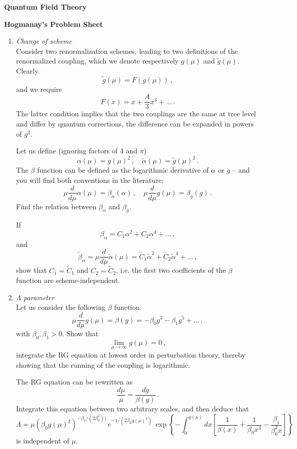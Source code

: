 \documentclass[12pt,a4paper]{article}
\begin{document}
\begin{center}
{\bf Quantum Field Theory}\\[\baselineskip]
\end{center}
{\bf Hogmanay's Problem Sheet}

\begin{enumerate}
\item {\it Change of scheme} \\

  Consider two renormalization schemes, leading to two definitions of
  the renormalized coupling, which we denote respectively $g(\mu)$ and
  $\tilde{g}(\mu)$. Clearly
  \[
    \tilde{g}(\mu) = F\left(g(\mu)\right)\, ,
  \]
  and we require
  \[
    F(x) = x + \frac{A}{3} x^3 + \ldots\, .
  \]
  The latter condition implies that the two couplings are the same at
  tree level and differ by quantum corrections, \ie the difference can
  be expanded in powers of $g^2$.

  Let us define (ignoring factors of 4 and $\pi$)
  \[
    \alpha(\mu) = g(\mu)^2\, , \quad \tilde{\alpha}(\mu) =
    \tilde{g}(\mu)^2\, .
  \]
  The $\beta$ function can be defined as the logarithmic derivative of
  $\alpha$ or $g$ -- and you will find both conventions in the
  literature:
  \[
    \mu\frac{d}{d\mu} \alpha(\mu) = \beta_\alpha(\alpha)\, , 
    \quad 
    \mu\frac{d}{d\mu} g(\mu) = \beta_g(g)\, . 
  \]
  Find the relation between $\beta_\alpha$ and $\beta_g$.

  If
  \[
    \beta_\alpha = C_1 \alpha^2 + C_2 \alpha^4 + \ldots\, ,
  \]
  and
  \[
    \tilde{\beta}_\alpha
    = \mu\frac{d}{d\mu} \tilde{\alpha}(\mu)
    = \tilde{C}_1 \tilde{\alpha}^2 + \tilde{C}_2 \tilde{\alpha}^4 +
    \ldots\, ,
  \]
  show that $C_1=\tilde{C}_1$ and $C_2=\tilde{C}_2$, i.e. the first
  two coefficients of the $\beta$ function are scheme-independent. 
  
  \bigskip
  
\item {\it $\Lambda$ parameter}\\

  Let us consider the following $\beta$ function:
  \[
    \mu\frac{d}{d\mu} g(\mu) = \beta(g) =-\beta_0 g^3 - \beta_1 g^5 +
    \ldots\, ,
  \]
  with $\beta_0,\beta_1>0$.
  Show that
  \[
    \lim_{\mu\to\infty} g(\mu) = 0\, ,
  \]
  integrate the RG equation at lowest order in perturbation theory,
  thereby showing that the running of the coupling is logarithmic.

  The RG equation can be rewritten as
  \[
    \frac{d\mu}{\mu} = \frac{dg}{\beta(g)}\, .
  \]
  Integrate this equation between two arbitrary scales, and then deduce that
  \[
    \Lambda = \mu \left(\beta_0 g(\mu)^2\right)^{-\beta_1/(2\beta_0^2))}\,
    e^{-1/(2\beta_0 g(\mu)^2)} \,
    \exp\left\{
      -\int_0^{g(\mu)} dx \left[
       \frac{1}{\beta(x)} + \frac{1}{\beta_0 x^3}-\frac{\beta_1}{\beta_0^2x} 
      \right]
    \right\}
  \]
  is independent of $\mu$. 


\end{enumerate}
\end{document}
